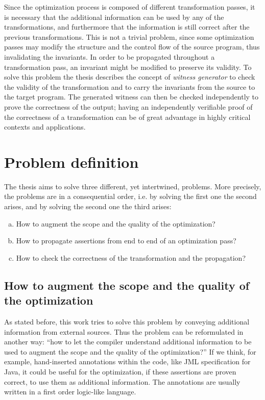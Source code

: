 Since the optimization process is composed of different transformation passes, it is necessary that the additional information can be used by any of the transformations, and furthermore that the information is still correct after the previous transformations. This is not a trivial problem, since some optimization passes may modify the structure and the control flow of the source program, thus invalidating the invariants. In order to be propagated throughout a transformation pass, an invariant might be modified to preserve its validity. To solve this problem the thesis describes the concept of \emph{witness generator} to check the validity of the transformation and to carry the invariants from the source to the target program. The generated witness can then be checked independently to prove the correctness of the output; having an independently verifiable proof of the correctness of a transformation can be of great advantage in highly critical contexts and applications.

\section{Problem definition}
\label{sec:problem_definition}

The thesis aims to solve three different, yet intertwined, problems. More precisely, the problems are in a consequential order, i.e. by solving the first one the second arises, and by solving the second one the third arises:
\begin{enumerate}[a)]
  \item How to augment the scope and the quality of the optimization?
  \item How to propagate assertions from end to end of an optimization pass?
  \item How to check the correctness of the transformation and the propagation?
\end{enumerate}

\subsection{How to augment the scope and the quality of the optimization}
\label{sub:how_to_augment_the_scope}
As stated before, this work tries to solve this problem by conveying additional information from external sources. Thus the problem can be reformulated in another way: ``how to let the compiler understand additional information to be used to augment the scope and the quality of the optimization?'' If we think, for example, hand-inserted annotations within the code, like JML specification for Java, it could be useful for the optimization, if these assertions are proven correct, to use them as additional information. The annotations are usually written in a first order logic-like language.

